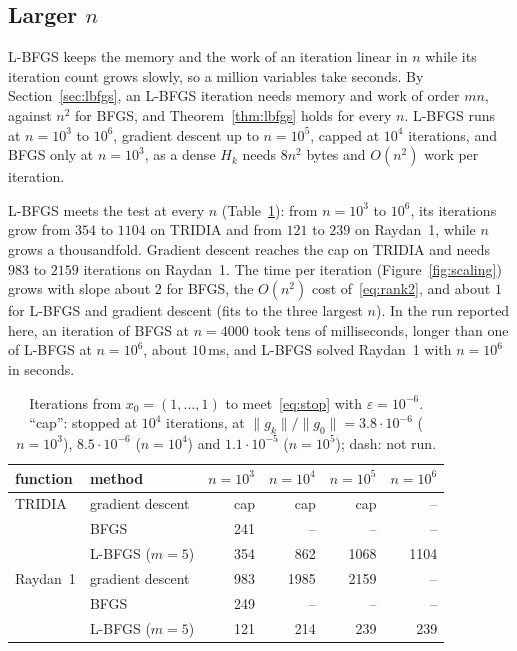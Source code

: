 \documentclass[11pt,a4paper]{amsart}
\numberwithin{equation}{section}
\theoremstyle{plain}
\theoremstyle{definition}
\theoremstyle{remark}
\newcommand{\norm}[1]{\lVert #1 \rVert}
\begin{document}
\subsection{Larger \texorpdfstring{$n$}{n}}\label{sec:large}

L-BFGS keeps the memory and the work of an iteration linear in $n$
while its iteration count grows slowly, so a million variables take
seconds. By Section~\ref{sec:lbfgs}, an L-BFGS iteration needs memory
and work of order $mn$, against $n^2$ for BFGS, and
Theorem~\ref{thm:lbfgs} holds for every $n$. L-BFGS runs at $n = 10^3$
to $10^6$, gradient descent up to $n = 10^5$, capped at $10^4$
iterations, and BFGS only at $n = 10^3$, as a dense $H_k$ needs $8n^2$
bytes and $O(n^2)$ work per iteration.

L-BFGS meets the test at every $n$ (Table~\ref{tab:large}): from
$n = 10^3$ to $10^6$, its iterations grow from $354$ to $1104$ on TRIDIA
and from $121$ to $239$ on Raydan~1, while $n$ grows a thousandfold.
Gradient descent reaches the cap on TRIDIA and needs $983$ to $2159$
iterations on Raydan~1. The time per iteration
(Figure~\ref{fig:scaling}) grows with slope about $2$ for BFGS, the
$O(n^2)$ cost of~\eqref{eq:rank2}, and about $1$ for L-BFGS and gradient
descent (fits to the three largest $n$). In the run reported here, an
iteration of BFGS at $n = 4000$ took tens of milliseconds, longer than
one of L-BFGS at $n = 10^6$, about $10$\,ms, and L-BFGS solved Raydan~1
with $n = 10^6$ in seconds.

\begin{table}[htb]
  \centering\small
  \caption{Iterations from ${x_0 = (1, \dots, 1)}$ to
    meet~\eqref{eq:stop} with ${\varepsilon = 10^{-6}}$. ``cap'': stopped
    at $10^4$ iterations, at $\norm{g_k} / \norm{g_0} = 3.8 \cdot
    10^{-6}$ ($n = 10^3$), $8.5 \cdot 10^{-6}$ ($n = 10^4$) and
    $1.1 \cdot 10^{-5}$ ($n = 10^5$); dash: not run.}
  \label{tab:large}
  \begin{tabular}{@{}llrrrr@{}}
    \toprule
    function & method & $n = 10^3$ & $n = 10^4$ & $n = 10^5$ & $n = 10^6$ \\
    \midrule
    TRIDIA   & gradient descent & cap &  cap &  cap &   -- \\
             & BFGS             & 241 &   -- &   -- &   -- \\
             & L-BFGS ($m = 5$) & 354 &  862 & 1068 & 1104 \\
    \addlinespace
    Raydan~1 & gradient descent & 983 & 1985 & 2159 &   -- \\
             & BFGS             & 249 &   -- &   -- &   -- \\
             & L-BFGS ($m = 5$) & 121 &  214 &  239 &  239 \\
    \bottomrule
  \end{tabular}
\end{table}
\end{document}
